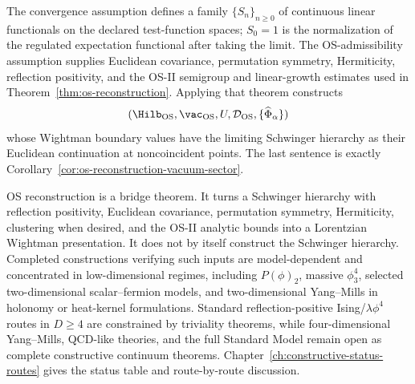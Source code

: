 The convergence assumption defines a family
\(\{S_n\}_{n\ge0}\) of continuous linear functionals on the declared
test-function spaces; \(S_0=1\) is the normalization of the regulated
expectation functional after taking the limit.  The OS-admissibility
assumption supplies Euclidean covariance, permutation symmetry, Hermiticity,
reflection positivity, and the OS-II semigroup and linear-growth estimates used in
Theorem~\ref{thm:os-reconstruction}.  Applying that theorem constructs
\[
  (\Hilb_{\rm OS},\vac_{\rm OS},U,\mathcal D_{\rm OS},
  \{\widehat\Phi_\alpha\})
\]
whose Wightman boundary values have the limiting Schwinger hierarchy as their
Euclidean continuation at noncoincident points.  The last sentence is exactly
Corollary~\ref{cor:os-reconstruction-vacuum-sector}.

\begin{remark}
\label{rem:os-constructive-status-inputs}
OS reconstruction is a bridge theorem.  It turns a Schwinger hierarchy with
reflection positivity, Euclidean covariance, permutation symmetry,
Hermiticity, clustering when desired, and the OS-II analytic bounds into a
Lorentzian Wightman presentation.  It does not by itself construct the
Schwinger hierarchy.  Completed constructions verifying such inputs are
model-dependent and concentrated in low-dimensional regimes, including
\(P(\phi)_2\), massive \(\phi^4_3\), selected two-dimensional
scalar--fermion models, and two-dimensional Yang--Mills in holonomy or
heat-kernel formulations.  Standard reflection-positive
Ising/\(\lambda\phi^4\) routes in \(D\ge4\) are constrained by triviality
theorems, while four-dimensional Yang--Mills, QCD-like theories, and the
full Standard Model remain open as complete constructive continuum
theorems.  Chapter~\ref{ch:constructive-status-routes} gives the status table
and route-by-route discussion.
\end{remark}

